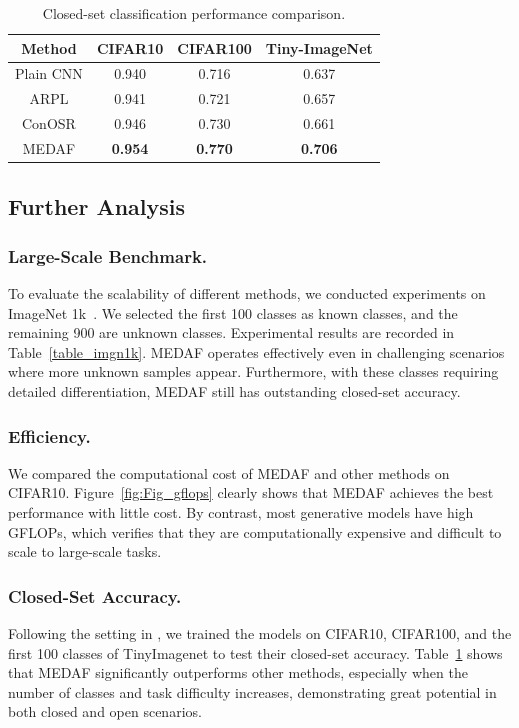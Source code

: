 \documentclass[letterpaper]{article} %
\begin{document}
\begin{table}[t]
\centering
\small
\begin{tabular}{cccc}
\hline
Method & CIFAR10 & CIFAR100 & Tiny-ImageNet \\ \hline 
Plain CNN & 0.940 & 0.716 & 0.637 \\ 
ARPL & 0.941 & 0.721 & 0.657  \\ 
ConOSR & 0.946 & 0.730 & 0.661 \\  \hline
MEDAF & \textbf{0.954} & \textbf{0.770} & \textbf{0.706}\\ \hline
\end{tabular}
\caption{Closed-set classification performance comparison.}
\label{table_close_acc}
\end{table}

\subsection{Further Analysis}
\subsubsection{Large-Scale Benchmark.}
To evaluate the scalability of different methods, we conducted experiments on ImageNet 1k~\cite{russakovsky2015imagenet}. We selected the first 100 classes as known classes, and the remaining 900 are unknown classes. Experimental results are recorded in Table~\ref{table_imgn1k}. MEDAF operates effectively even in challenging scenarios where more unknown samples appear. Furthermore, with these classes requiring detailed differentiation, MEDAF still has outstanding closed-set accuracy.

\subsubsection{Efficiency.}
We compared the computational cost of MEDAF and other methods on CIFAR10. Figure~\ref{fig:Fig_gflops} clearly shows that MEDAF achieves the best performance with little cost. By contrast, most generative models have high GFLOPs, which verifies that they are computationally expensive and difficult to scale to large-scale tasks.

\subsubsection{Closed-Set Accuracy.}
Following the setting in \cite{xu2023contrastive}, we trained the models on CIFAR10, CIFAR100, and the first 100 classes of TinyImagenet to test their closed-set accuracy. Table~\ref{table_close_acc} shows that MEDAF significantly outperforms other methods, especially when the number of classes and task difficulty increases, demonstrating great potential in both closed and open scenarios.
\end{document}
